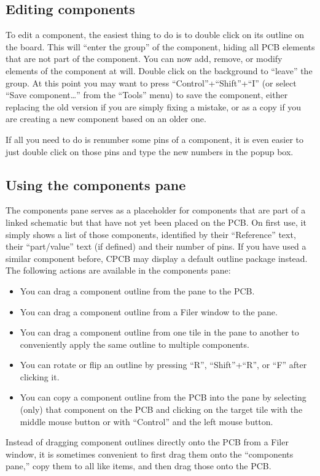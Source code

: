 \documentclass[11pt]{report}
\begin{document}
\subsection{Editing components}

To edit a component, the easiest thing to do is to double click on its
outline on the board. This will ``enter the group'' of the component,
hiding all PCB elements that are not part of the component. You can
now add, remove, or modify elements of the component at will. Double
click on the background to ``leave'' the group. At this point you may
want to  press ``Control''+``Shift''+``I'' (or select
``Save component…'' from the ``Tools'' menu) to save the component,
either replacing the old version if you are simply fixing a mistake,
or as a copy if you are creating a new component based on an older
one.

If all you need to do is renumber some pins of a component, it is even
easier to just double click on those pins and type the new numbers in
the popup box.

\subsection{Using the components pane}\label{sec.comp.pane}

The components pane serves  as a placeholder for components that are
part of a linked schematic but that have not yet been placed on the
PCB. On first use, it simply shows a list of those components,
identified by their ``Reference'' text, their ``part/value'' text (if
defined) and their number of pins. If you have used a similar
component before, CPCB may display a default outline package
instead. The following actions are available in the components pane:
\begin{itemize}
\item You can drag a component outline from the pane to the PCB.
\item You can drag a component outline from a Filer window to the pane.
\item You can drag a component outline from one tile in the pane to
  another to conveniently apply the same outline to multiple
  components.
\item You can rotate or flip an outline by pressing ``R'',
  ``Shift''+``R'', or ``F'' after clicking it.
\item You can copy a component outline from the PCB into the pane by
  selecting (only) that component on the PCB and clicking on the
  target tile with the middle mouse button or with ``Control'' and
  the left mouse button.
\end{itemize}
Instead of dragging component outlines directly onto the PCB from  a
Filer window, it is sometimes
convenient to first drag them onto the ``components pane,'' copy them
to all like items, and then drag those onto the PCB.
\end{document}
